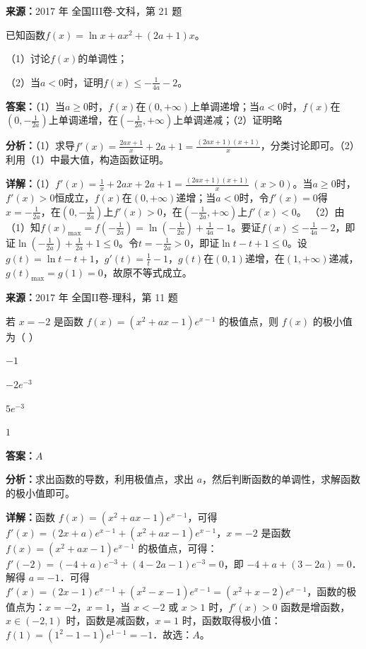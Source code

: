 \begin{question}[points=12]
\textbf{来源：}2017 年 全国III卷-文科，第 21 题\par
已知函数$f(x)=\ln x+ax^2+(2a+1)x$。

（1）讨论$f(x)$的单调性；

（2）当$a<0$时，证明$f(x)\le -\frac{1}{4a}-2$。
\begin{solution}
\textbf{答案：}（1）当$a\ge 0$时，$f(x)$在$(0,+\infty)$上单调递增；当$a<0$时，$f(x)$在$(0,-\frac{1}{2a})$上单调递增，在$(-\frac{1}{2a},+\infty)$上单调递减；（2）证明略

\textbf{分析：}（1）求导$f'(x)=\frac{2ax+1}{x}+2a+1=\frac{(2ax+1)(x+1)}{x}$，分类讨论即可。（2）利用（1）中最大值，构造函数证明。

\textbf{详解：}（1）$f'(x)=\frac{1}{x}+2ax+2a+1=\frac{(2ax+1)(x+1)}{x}\ (x>0)$。当$a\ge 0$时，$f'(x)>0$恒成立，$f(x)$在$(0,+\infty)$递增；当$a<0$时，令$f'(x)=0$得$x=-\frac{1}{2a}$，在$(0,-\frac{1}{2a})$上$f'(x)>0$，在$(-\frac{1}{2a},+\infty)$上$f'(x)<0$。
（2）由（1）知$f(x)_{\max}=f(-\frac{1}{2a})=\ln(-\frac{1}{2a})+\frac{1}{4a}-1$。要证$f(x)\le -\frac{1}{4a}-2$，即证$\ln(-\frac{1}{2a})+\frac{1}{2a}+1\le 0$。令$t=-\frac{1}{2a}>0$，即证$\ln t-t+1\le 0$。设$g(t)=\ln t-t+1$，$g'(t)=\frac{1}{t}-1$，$g(t)$在$(0,1)$递增，在$(1,+\infty)$递减，$g(t)_{\max}=g(1)=0$，故原不等式成立。
\end{solution}
\end{question}

\begin{question}[points=5]
\textbf{来源：}2017 年 全国II卷-理科，第 11 题\par
若 $x=-2$ 是函数 $f(x)=(x^2+ax-1)e^{x-1}$ 的极值点，则 $f(x)$ 的极小值为（   ）
\begin{choices}
  \item $-1$
  \item $-2e^{-3}$
  \item $5e^{-3}$
  \item $1$
\end{choices}
\begin{solution}
\textbf{答案：}$A$

\textbf{分析：}求出函数的导数，利用极值点，求出 $a$，然后判断函数的单调性，求解函数的极小值即可。

\textbf{详解：}函数 $f(x)=(x^2+ax-1)e^{x-1}$，可得 $f'(x)=(2x+a)e^{x-1}+(x^2+ax-1)e^{x-1}$，$x=-2$ 是函数 $f(x)=(x^2+ax-1)e^{x-1}$ 的极值点，可得：$f'(-2)=(-4+a)e^{-3}+(4-2a-1)e^{-3}=0$，即 $-4+a+(3-2a)=0$．解得 $a=-1$．可得 $f'(x)=(2x-1)e^{x-1}+(x^2-x-1)e^{x-1}=(x^2+x-2)e^{x-1}$，函数的极值点为：$x=-2$，$x=1$，当 $x<-2$ 或 $x>1$ 时，$f'(x)>0$ 函数是增函数，$x\in(-2,1)$ 时，函数是减函数，$x=1$ 时，函数取得极小值：$f(1)=(1^2-1-1)e^{1-1}=-1$．故选：$A$。
\end{solution}
\end{question}

